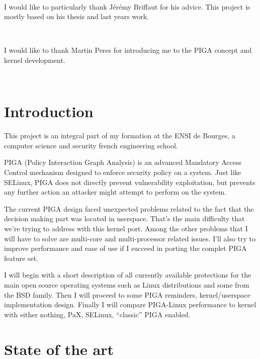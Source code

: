 \documentclass[pdftex,a4paper,titlepage,11pt]{article}
\begin{document}
~

I would like to particularly thank Jérémy Briffaut for his advice. This project is mostly based on his thesis and last years work.

~

I would like to thank Martin Peres for introducing me to the PIGA concept and kernel development.

~

\newpage

\tableofcontents

\newpage

\listoffigures

\newpage

\section*{Introduction} 

This project is an integral part of my formation at the ENSI de Bourges, a computer science and security french engineering school.

PIGA (Policy Interaction Graph Analysis) is an advanced Mandatory Access Control mechanism designed to enforce security policy on a system. Just like SELinux, PIGA does not directly prevent vulnerability exploitation, but prevents any further action an attacker might attempt to perform on the system.

The current PIGA design faced unexpected problems related to the fact that the decision making part was located in userspace. That's the main difficulty that we're trying to address with this kernel port. Among the other problems that I will have to solve are multi-core and multi-processor related issues. I'll also try to improve performance and ease of use if I succeed in porting the complet PIGA feature set.

I will begin with a short description of all currently available protections for the main open source operating systems such as Linux distributions and some from the BSD family. Then I will proceed to some PIGA reminders, kernel/userspace implementation design. Finally I will compare PIGA-Linux performance to kernel with either nothing, PaX, SELinux, ``classic'' PIGA enabled.


\newpage

\section{State of the art}
\end{document}
